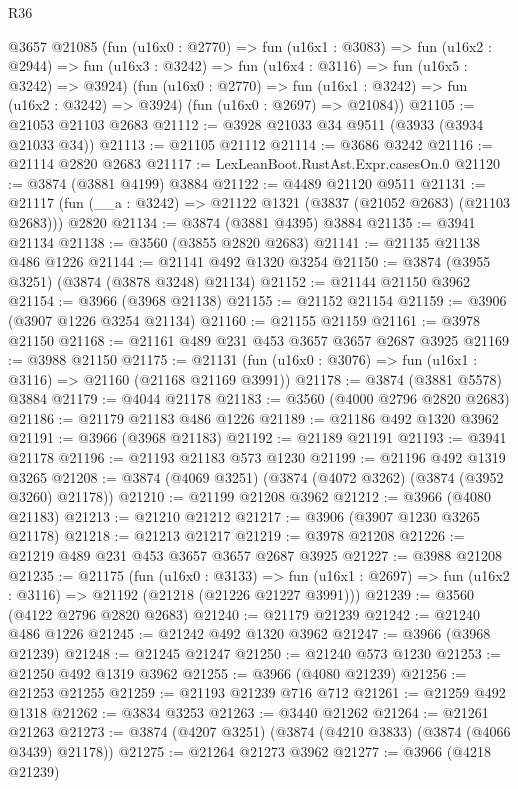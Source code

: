\begin{lexlean}{R36}
\begin{coremodule}
      @3657
      @21085
      (fun (u16x0 : @2770) =>
      fun (u16x1 : @3083) =>
      fun (u16x2 : @2944) =>
      fun (u16x3 : @3242) => fun (u16x4 : @3116) => fun (u16x5 : @3242) => @3924)
      (fun (u16x0 : @2770) => fun (u16x1 : @3242) => fun (u16x2 : @3242) => @3924)
      (fun (u16x0 : @2697) => @21084))
@21105 := @21053 @21103 @2683
@21112 := @3928 @21033 @34 @9511 (@3933 (@3934 @21033 @34))
@21113 := @21105 @21112
@21114 := @3686 @3242
@21116 := @21114 @2820 @2683
@21117 := LexLeanBoot.RustAst.Expr.casesOn.{0}
@21120 := @3874 (@3881 @4199) @3884
@21122 := @4489 @21120 @9511
@21131 := @21117 (fun (__a : @3242) => @21122 @1321 (@3837 (@21052 @2683) (@21103 @2683))) @2820
@21134 := @3874 (@3881 @4395) @3884
@21135 := @3941 @21134
@21138 := @3560 (@3855 @2820 @2683)
@21141 := @21135 @21138 @486 @1226
@21144 := @21141 @492 @1320 @3254
@21150 := @3874 (@3955 @3251) (@3874 (@3878 @3248) @21134)
@21152 := @21144 @21150 @3962
@21154 := @3966 (@3968 @21138)
@21155 := @21152 @21154
@21159 := @3906 (@3907 @1226 @3254 @21134)
@21160 := @21155 @21159
@21161 := @3978 @21150
@21168 := @21161 @489 @231 @453 @3657 @3657 @2687 @3925
@21169 := @3988 @21150
@21175 := @21131 (fun (u16x0 : @3076) => fun (u16x1 : @3116) => @21160 (@21168 @21169 @3991))
@21178 := @3874 (@3881 @5578) @3884
@21179 := @4044 @21178
@21183 := @3560 (@4000 @2796 @2820 @2683)
@21186 := @21179 @21183 @486 @1226
@21189 := @21186 @492 @1320 @3962
@21191 := @3966 (@3968 @21183)
@21192 := @21189 @21191
@21193 := @3941 @21178
@21196 := @21193 @21183 @573 @1230
@21199 := @21196 @492 @1319 @3265
@21208 := @3874 (@4069 @3251) (@3874 (@4072 @3262) (@3874 (@3952 @3260) @21178))
@21210 := @21199 @21208 @3962
@21212 := @3966 (@4080 @21183)
@21213 := @21210 @21212
@21217 := @3906 (@3907 @1230 @3265 @21178)
@21218 := @21213 @21217
@21219 := @3978 @21208
@21226 := @21219 @489 @231 @453 @3657 @3657 @2687 @3925
@21227 := @3988 @21208
@21235 := @21175
    (fun (u16x0 : @3133) =>
    fun (u16x1 : @2697) => fun (u16x2 : @3116) => @21192 (@21218 (@21226 @21227 @3991)))
@21239 := @3560 (@4122 @2796 @2820 @2683)
@21240 := @21179 @21239
@21242 := @21240 @486 @1226
@21245 := @21242 @492 @1320 @3962
@21247 := @3966 (@3968 @21239)
@21248 := @21245 @21247
@21250 := @21240 @573 @1230
@21253 := @21250 @492 @1319 @3962
@21255 := @3966 (@4080 @21239)
@21256 := @21253 @21255
@21259 := @21193 @21239 @716 @712
@21261 := @21259 @492 @1318
@21262 := @3834 @3253
@21263 := @3440 @21262
@21264 := @21261 @21263
@21273 := @3874 (@4207 @3251) (@3874 (@4210 @3833) (@3874 (@4066 @3439) @21178))
@21275 := @21264 @21273 @3962
@21277 := @3966 (@4218 @21239)

\end{coremodule}
\end{lexlean}
